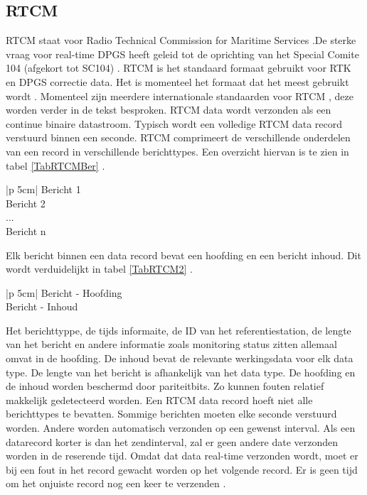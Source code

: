 \subsection{RTCM}
\label{LRTC}
RTCM staat voor Radio Technical Commission for Maritime Services \cite{LBibGLONASS}.De sterke vraag voor real-time DPGS heeft geleid tot de oprichting van het Special Comite 104 (afgekort tot SC104) \cite{LBibRTCM}. RTCM is het standaard formaat gebruikt voor RTK en DPGS correctie data. Het is momenteel het formaat dat het meest gebruikt wordt \cite{LBibRTK3}. Momenteel zijn meerdere internationale standaarden voor RTCM \cite{LBibRTCM}, deze worden verder in de tekst besproken. RTCM data wordt verzonden als een continue binaire datastroom. Typisch wordt een volledige RTCM data record verstuurd binnen een seconde. RTCM comprimeert de verschillende onderdelen van een record in verschillende berichttypes. Een overzicht hiervan is te zien in tabel \ref{TabRTCMBer} \cite{LBibRTCM3}.
\begin{table}[hbp]
	\caption{RTCM record, verdeeld in verschillende berichttypes}		
	\begin{tabular}{|p {5cm}|}	
		\hline
		Bericht 1 \\ \hline
		Bericht 2 \\ \hline
		... \\ \hline
		Bericht n \\ \hline
	\end{tabular}
	\label{TabRTCMBer}
\end{table}
Elk bericht binnen een data record bevat een hoofding en een bericht inhoud. Dit wordt verduidelijkt in tabel \ref{TabRTCM2} \cite{LBibRTCM3}.
\begin{table}[hbp]
	\caption{RTCM bericht, verdeeld in hoofding en bericht}		
	\begin{tabular}{|p {5cm}|}	
		\hline
		Bericht - Hoofding \\ \hline
		Bericht - Inhoud \\ \hline
	\end{tabular}
	\label{TabRTCM2}
\end{table}
Het berichttyppe, de tijds informaite, de ID van het referentiestation, de lengte van het bericht en andere informatie zoals monitoring status zitten allemaal omvat in de hoofding. De inhoud bevat de relevante werkingsdata voor elk data type. De lengte van het bericht is afhankelijk van het data type. De hoofding en de inhoud worden beschermd door pariteitbits. Zo kunnen fouten relatief makkelijk gedetecteerd worden. Een RTCM data record hoeft niet alle berichttypes te bevatten. Sommige berichten moeten elke seconde verstuurd worden. Andere worden automatisch verzonden op een gewenst interval. Als een datarecord korter is dan het zendinterval, zal er geen andere date verzonden worden in de reserende tijd. Omdat dat data real-time verzonden wordt, moet er bij een fout in het record gewacht worden op het volgende record. Er is geen tijd om het onjuiste record nog een keer te verzenden \cite{LBibRTCM3}. 

